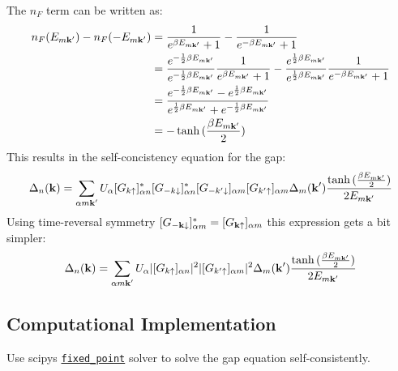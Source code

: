 \documentclass[../main.tex]{subfiles}
\begin{document}
The \(n_F\) term can be written as:
\begin{align}
    n_F(E_{m \bm{\mathrm{k}}^{\prime}}) - n_F(-E_{m \bm{\mathrm{k}}^{\prime}}) &= \frac{1}{e^{\beta E_{m \bm{\mathrm{k}}^{\prime}}} + 1} - \frac{1}{e^{-\beta E_{m \bm{\mathrm{k}}^{\prime}}} + 1} \\
    &= \frac{e^{-\frac{1}{2} \beta E_{m \bm{\mathrm{k}}^{\prime} }}}{e^{-\frac{1}{2} \beta E_{m \bm{\mathrm{k}}^{\prime}}}} \frac{1}{e^{\beta E_{m \bm{\mathrm{k}}^{\prime}}} + 1} - \frac{e^{\frac{1}{2} \beta E_{m \bm{\mathrm{k}}^{\prime}}}}{e^{\frac{1}{2} \beta E_{m \bm{\mathrm{k}}^{\prime}}}} \frac{1}{e^{-\beta E_{m \bm{\mathrm{k}}^{\prime}}} + 1} \\
    &= \frac{e^{-\frac{1}{2} \beta E_{m \bm{\mathrm{k}}^{\prime}}} - e^{\frac{1}{2} \beta E_{m \bm{\mathrm{k}}^{\prime}}}}{e^{\frac{1}{2} \beta E_{m \bm{\mathrm{k}}^{\prime}}} + e^{-\frac{1}{2} \beta E_{m \bm{\mathrm{k}}^{\prime} }}} \\
    &= -\tanh{(\frac{\beta E_{m \bm{\mathrm{k}}^{\prime}}}{2})}
\end{align}
This results in the self-concistency equation for the gap:
\begin{align}
    \Delta_n (\bm{\mathrm{k}}) = \sum_{\alpha m \bm{\mathrm{k}}^{\prime}} U_{\alpha} [G_{k \uparrow}]_{\alpha n}^* [G_{-k \downarrow}]_{\alpha n}^* [G_{-k^{\prime} \downarrow}]_{\alpha m} [G_{k^{\prime} \uparrow}]_{\alpha m} \Delta_{m} (\bm{\mathrm{k}}^{\prime}) \frac{\tanh{(\frac{\beta E_{m \bm{\mathrm{k}}^{\prime}}}{2})}}{2 E_{m \bm{\mathrm{k}}^{\prime}}}
\end{align}
Using time-reversal symmetry \([G_{-\bm{\mathrm{k}} \downarrow}]_{\alpha m}^* = [G_{\bm{\mathrm{k}} \uparrow}]_{\alpha m}\) this expression gets a bit simpler:
\begin{align}
    \Delta_n (\bm{\mathrm{k}}) = \sum_{\alpha m \bm{\mathrm{k}}^{\prime}} U_{\alpha} \vert[G_{k \uparrow}]_{\alpha n} \vert^2 \vert[G_{k^{\prime} \uparrow}]_{\alpha m} \vert^2 \Delta_{m} (\bm{\mathrm{k}}^{\prime}) \frac{\tanh{(\frac{\beta E_{m \bm{\mathrm{k}}^{\prime}}}{2})}}{2 E_{m \bm{\mathrm{k}}^{\prime}}}
\end{align}

\subsection{Computational Implementation}

Use scipys \href{https://docs.scipy.org/doc/scipy/reference/generated/scipy.optimize.fixed_point.html}{\texttt{fixed\_point}} solver to solve the gap equation self-consistently.
\end{document}
